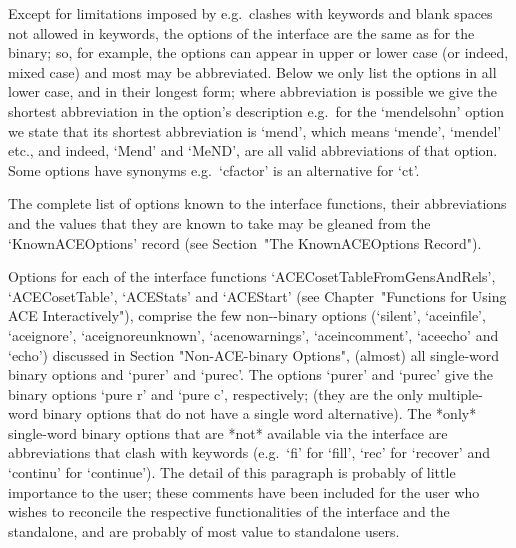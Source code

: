 
Except for limitations imposed by {\GAP}  e.g.\  clashes  with  {\GAP}
keywords and blank spaces not allowed in keywords, the options of  the
{\ACE} interface are the same as for the binary; so, for example,  the
options can appear in upper or lower case (or indeed, mixed case)  and
most may be abbreviated. Below we only list the options in  all  lower
case, and in their longest form; where  abbreviation  is  possible  we
give the shortest abbreviation in the  option's  description  e.g.~for
the `mendelsohn' option we state that  its  shortest  abbreviation  is
`mend', which means `mende', `mendel' etc.,  and  indeed,  `Mend'  and
`MeND', are all valid abbreviations of that option. Some options  have
synonyms e.g.~`cfactor' is an alternative for `ct'.

The complete list of {\ACE} options  known  to  the  {\ACE}  interface
functions, their abbreviations and the values that they are  known  to
take  may  be  gleaned  from   the   `KnownACEOptions'   record   (see
Section~"The KnownACEOptions Record").

Options  for each of  the       {\ACE}       interface       functions
`ACECosetTableFromGensAndRels',   `ACECosetTable',   `ACEStats'    and
`ACEStart' (see  Chapter~"Functions  for  Using  ACE  Interactively"),
comprise the few  non-{\ACE}-binary  options  (`silent',  `aceinfile',
`aceignore',   `aceignoreunknown',    `acenowarnings',
`aceincomment',     `aceecho'     and     `echo')     discussed     in
Section "Non-ACE-binary  Options",  (almost)  all  single-word  {\ACE}
binary options and  `purer'  and  `purec'.  The  options  `purer'  and
`purec' give  the  {\ACE}  binary  options  `pure  r'  and  `pure  c',
respectively; (they are the only multiple-word {\ACE}  binary  options
that do not have a single word alternative).  The  *only*  single-word
{\ACE}  binary  options  that  are  *not*  available  via  the  {\ACE}
interface are abbreviations that clash with {\GAP} keywords (e.g.~`fi'
for `fill', `rec' for `recover' and  `continu'  for  `continue').  The
detail of this paragraph is  probably  of  little  importance  to  the
{\GAP} user; these comments have been included for the user who wishes
to reconcile the respective functionalities of  the  {\ACE}  interface
and  the  {\ACE}  standalone,  and  are  probably  of  most  value  to
standalone users.



